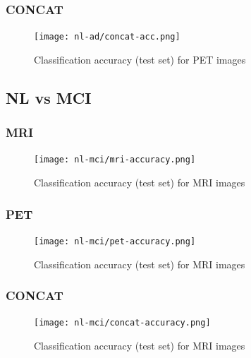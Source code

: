 \documentclass[12pt,a4paper]{article}
\begin{document}
\subsubsection{CONCAT}
\label{sec:cat}

\begin{figure}[H]
  \centering
  \texttt{[image: nl-ad/concat-acc.png]}
  \caption{\label{fig:desigffhn}Classification accuracy (test set) for PET images}
\end{figure}

\subsection{NL vs MCI}

\subsubsection{MRI}

\begin{figure}[H]
  \centering
  \texttt{[image: nl-mci/mri-accuracy.png]}
  \caption{\label{desigan}Classification accuracy (test set) for MRI images}
\end{figure}

\subsubsection{PET}

\begin{figure}[H]
  \centering
  \texttt{[image: nl-mci/pet-accuracy.png]}
  \caption{\label{afig:design}Classification accuracy (test set) for MRI images}
\end{figure}

\subsubsection{CONCAT}

\begin{figure}[H]
  \centering
  \texttt{[image: nl-mci/concat-accuracy.png]}
  \caption{\label{fffpig:design}Classification accuracy (test set) for MRI images}
\end{figure}
\end{document}

